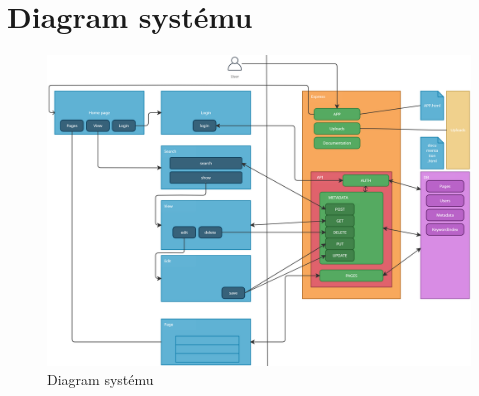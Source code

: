 \section{Diagram systému}
\begin{figure}[H]
	\centering
	\includegraphics[angle=-90,origin=c,width=\linewidth]{img/diagram.png}
	\caption{Diagram systému}
\end{figure}
